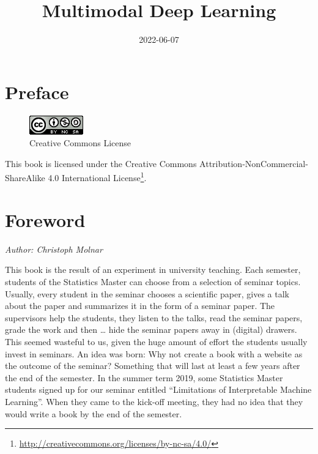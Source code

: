 \documentclass[
]{krantz}
\title{Multimodal Deep Learning}
\author{}
\date{\vspace{-2.5em}2022-06-07}
\renewcommand{\href}[2]{#2\footnote{\url{#1}}}
\begin{document}
\maketitle


\thispagestyle{empty}

\begin{center}
\end{center}

\setlength{\abovedisplayskip}{-5pt}
\setlength{\abovedisplayshortskip}{-5pt}

{
\hypersetup{linkcolor=}
\setcounter{tocdepth}{0}
\tableofcontents
}
\hypertarget{preface}{%
\chapter*{Preface}\label{preface}}


\begin{figure}
\centering
\includegraphics{figures/by-nc-sa.png}
\caption{Creative Commons License}
\end{figure}

This book is licensed under the \href{http://creativecommons.org/licenses/by-nc-sa/4.0/}{Creative Commons Attribution-NonCommercial-ShareAlike 4.0 International License}.

\mainmatter

\hypertarget{foreword}{%
\chapter*{Foreword}\label{foreword}}


\emph{Author: Christoph Molnar}

This book is the result of an experiment in university teaching.
Each semester, students of the Statistics Master can choose from a selection of seminar topics.
Usually, every student in the seminar chooses a scientific paper, gives a talk about the paper and summarizes it in the form of a seminar paper.
The supervisors help the students, they listen to the talks, read the seminar papers, grade the work and then \ldots{} hide the seminar papers away in (digital) drawers.
This seemed wasteful to us, given the huge amount of effort the students usually invest in seminars.
An idea was born:
Why not create a book with a website as the outcome of the seminar?
Something that will last at least a few years after the end of the semester.
In the summer term 2019, some Statistics Master students signed up for our seminar entitled ``Limitations of Interpretable Machine Learning''.
When they came to the kick-off meeting, they had no idea that they would write a book by the end of the semester.
\end{document}
